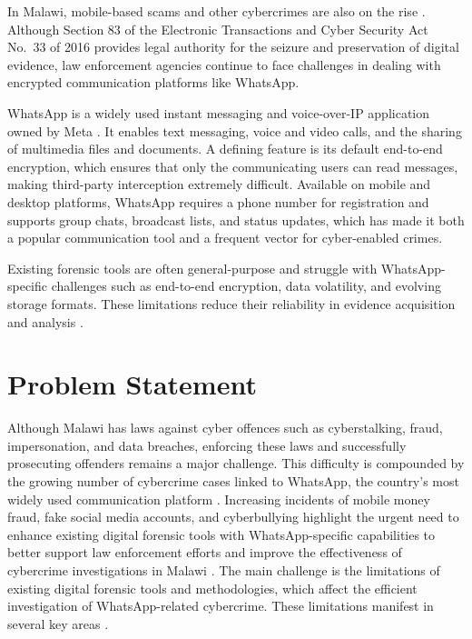\documentclass[12pt,a4paper]{report}
\begin{document}
In Malawi, mobile-based scams and other cybercrimes are also on the rise \citep{nyirenda2024}. Although Section 83 of the Electronic Transactions and Cyber Security Act No.\ 33 of 2016 provides legal authority for the seizure and preservation of digital evidence, law enforcement agencies continue to face challenges in dealing with encrypted communication platforms like WhatsApp.

WhatsApp is a widely used instant messaging and voice-over-IP application owned by Meta \cite{whatsapp2026}. It enables text messaging, voice and video calls, and the sharing of multimedia files and documents. A defining feature is its default end-to-end encryption, which ensures that only the communicating users can read messages, making third-party interception extremely difficult. Available on mobile and desktop platforms, WhatsApp requires a phone number for registration and supports group chats, broadcast lists, and status updates, which has made it both a popular communication tool and a frequent vector for cyber-enabled crimes.

Existing forensic tools are often general-purpose and struggle with WhatsApp-specific challenges such as end-to-end encryption, data volatility, and evolving storage formats. These limitations reduce their reliability in evidence acquisition and analysis \citep{vinayagam2025}.



\section{Problem Statement}

Although Malawi has laws against cyber offences such as cyberstalking, fraud, impersonation, and data breaches, enforcing these laws and successfully prosecuting offenders remains a major challenge\cite{nyirenda2024, kajoloweka2022}. This difficulty is compounded by the growing number of cybercrime cases linked to WhatsApp, the country's most widely used communication platform \citep{chiputula2024}. Increasing incidents of mobile money fraud, fake social media accounts, and cyberbullying highlight the urgent need to enhance existing digital forensic tools with WhatsApp-specific capabilities to better support law enforcement efforts and improve the effectiveness of cybercrime investigations in Malawi \citep{balogh2025}. The main challenge is the limitations of existing digital forensic tools and methodologies, which affect the efficient investigation of WhatsApp-related cybercrime. These limitations manifest in several key areas \citep{oxygen2023, sutikno2024}.
\end{document}
